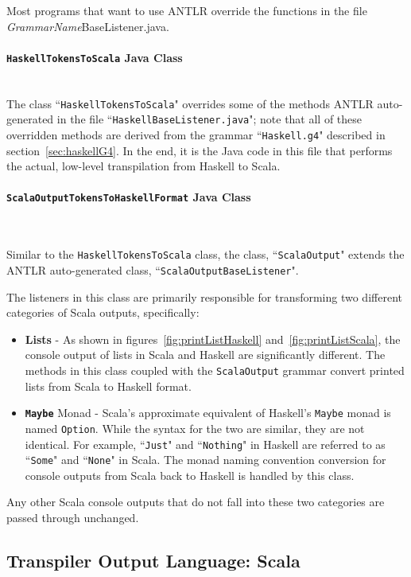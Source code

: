 \documentclass{report}
\newcommand{\myparagraph}[1]{\paragraph{#1}\mbox{}\\}
\begin{document}
Most programs that want to use ANTLR override the functions in the file \emph{GrammarName}BaseListener.java.


\myparagraph{\texttt{HaskellTokensToScala} Java Class}

The class ``\texttt{HaskellTokensToScala}" overrides some of the methods ANTLR auto-generated in the file ``\texttt{HaskellBaseListener.java}"; note that all of these overridden methods are derived from the grammar ``\texttt{Haskell.g4}" described in section~\ref{sec:haskellG4}.  In the end, it is the Java code in this file that performs the actual, low-level transpilation from Haskell to Scala.

\myparagraph{\texttt{ScalaOutputTokensToHaskellFormat} Java Class}\label{sec:scalaOutputFunctionality}

Similar to the \texttt{HaskellTokensToScala} class, the class, ``\texttt{ScalaOutput}" extends the ANTLR auto-generated class, ``\texttt{ScalaOutputBaseListener}".

The listeners in this class are primarily responsible for transforming two different categories of Scala outputs, specifically:

\begin{itemize}

\item \textbf{Lists} - As shown in figures~\ref{fig:printListHaskell} and~\ref{fig:printListScala}, the console output of lists in Scala and Haskell are significantly different.  The methods in this class coupled with the \texttt{ScalaOutput} grammar convert printed lists from Scala to Haskell format.

\item \textbf{\texttt{Maybe}} Monad - Scala's approximate equivalent of Haskell's \texttt{Maybe} monad is named \texttt{Option}.  While the syntax for the two are similar, they are not identical.  For example, ``\texttt{Just}" and ``\texttt{Nothing}" in Haskell are referred to as ``\texttt{Some}" and ``\texttt{None}" in Scala.  The monad naming convention conversion for console outputs from Scala back to Haskell is handled by this class.

\end{itemize}

Any other Scala console outputs that do not fall into these two categories are passed through unchanged.


\subsection{Transpiler Output Language: Scala}
\end{document}

